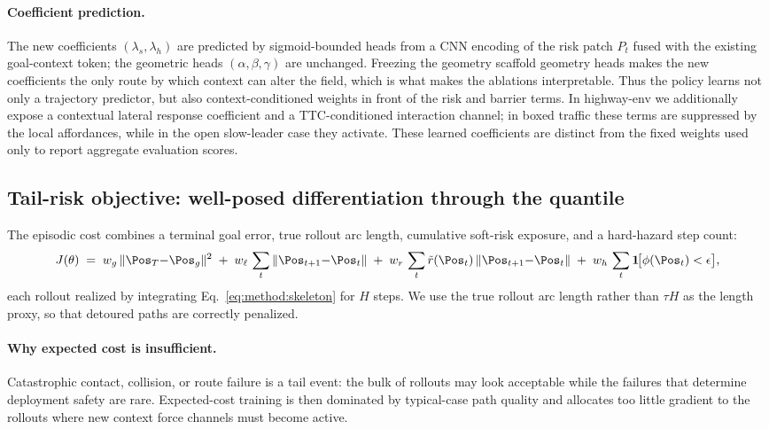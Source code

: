 \paragraph{Coefficient prediction.}
The new coefficients $(\lambda_s, \lambda_h)$ are predicted by
sigmoid-bounded heads from a CNN encoding of the risk patch $P_t$
fused with the existing goal-context token; the geometric heads
$(\alpha,\beta,\gamma)$ are unchanged. Freezing the geometry scaffold geometry
heads makes the new coefficients the only route by which context can
alter the field, which is what makes the ablations interpretable.
Thus the policy learns not only a trajectory predictor, but also
context-conditioned weights in front of the risk and barrier terms. In
highway-env we additionally expose a contextual lateral response
coefficient and a TTC-conditioned interaction channel; in boxed traffic
these terms are suppressed by the local affordances, while in the open
slow-leader case they activate.
These learned coefficients are distinct from the fixed weights used only
to report aggregate evaluation scores.

\subsection{Tail-risk objective: well-posed differentiation through the quantile}
\label{sec:method:cvar}

The episodic cost combines a terminal goal error, true rollout arc
length, cumulative soft-risk exposure, and a hard-hazard step count:
\begin{equation}
J(\theta) \;=\;
w_g\,\|\Pos_T{-}\Pos_g\|^2
\;+\; w_\ell\,\sum_t \|\Pos_{t+1}{-}\Pos_t\|
\;+\; w_r\,\sum_t \tilde r(\Pos_t)\,\|\Pos_{t+1}{-}\Pos_t\|
\;+\; w_h\,\sum_t \mathbf{1}\!\bigl[\phi(\Pos_t) < \epsilon\bigr],
\label{eq:method:J}
\end{equation}
each rollout realized by integrating Eq.~\eqref{eq:method:skeleton} for
$H$ steps. We use the true rollout arc length rather than $\tau H$ as
the length proxy, so that detoured paths are correctly penalized.

\paragraph{Why expected cost is insufficient.}
Catastrophic contact, collision, or route failure is a tail event: the
bulk of rollouts may look acceptable while the failures that determine
deployment safety are rare. Expected-cost training is then dominated by
typical-case path quality and allocates too little gradient to the
rollouts where new context force channels must become active.

